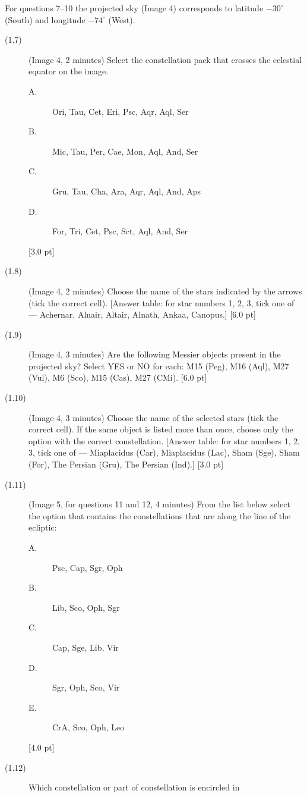 For questions 7--10 the projected sky (Image 4) corresponds to latitude
$-30^\circ$ (South) and longitude $-74^\circ$ (West).

\begin{description}
\item[(1.7)] (Image 4, 2 minutes) Select the constellation pack that crosses
  the celestial equator on the image.
  \begin{description}
  \item[A.] Ori, Tau, Cet, Eri, Psc, Aqr, Aql, Ser
  \item[B.] Mic, Tau, Per, Cae, Mon, Aql, And, Ser
  \item[C.] Gru, Tau, Cha, Ara, Aqr, Aql, And, Aps
  \item[D.] For, Tri, Cet, Psc, Sct, Aql, And, Ser
  \end{description}
  \hfill[3.0 pt]
\item[(1.8)] (Image 4, 2 minutes) Choose the name of the stars indicated by
  the arrows (tick the correct cell).
  [Answer table: for star numbers 1, 2, 3, tick one of --- Achernar,
  Alnair, Altair, Alnath, Ankaa, Canopus.] \hfill[6.0 pt]
\item[(1.9)] (Image 4, 3 minutes) Are the following Messier objects present
  in the projected sky? Select YES or NO for each:
  M15 (Peg), M16 (Aql), M27 (Vul), M6 (Sco), M15 (Cas), M27 (CMi).
  \hfill[6.0 pt]
\item[(1.10)] (Image 4, 3 minutes) Choose the name of the selected stars
  (tick the correct cell). If the same object is listed more than once,
  choose only the option with the correct constellation.
  [Answer table: for star numbers 1, 2, 3, tick one of --- Miaplacidus
  (Car), Miaplacidus (Lac), Sham (Sge), Sham (For), The Persian (Gru), The
  Persian (Ind).] \hfill[3.0 pt]
\item[(1.11)] (Image 5, for questions 11 and 12, 4 minutes) From the list
  below select the option that contains the constellations that are along
  the line of the ecliptic:
  \begin{description}
  \item[A.] Psc, Cap, Sgr, Oph
  \item[B.] Lib, Sco, Oph, Sgr
  \item[C.] Cap, Sge, Lib, Vir
  \item[D.] Sgr, Oph, Sco, Vir
  \item[E.] CrA, Sco, Oph, Leo
  \end{description}
  \hfill[4.0 pt]
\item[(1.12)] Which constellation or part of constellation is encircled in

\end{description}
